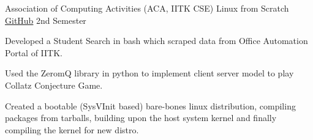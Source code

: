\begin{cventries}
  \cventry
  {Association of Computing Activities (ACA, IITK CSE)}
  {Linux from Scratch}
  {\href{https://github.com/mayanksha/lfs}{\faGithubSquare\acvHeaderIconSep GitHub}}
  {2nd Semester}
  {
    \begin{cvitems}
    \item Developed a Student Search in bash which scraped data from Office Automation Portal of IITK.
    \item Used the ZeromQ library in python to implement client server model to play Collatz Conjecture Game.
    \item Created a bootable (SysVInit based) bare-bones linux distribution, compiling packages from tarballs, building upon the host system kernel and finally compiling the kernel for new distro.
    \end{cvitems}
  }


\end{cventries}

